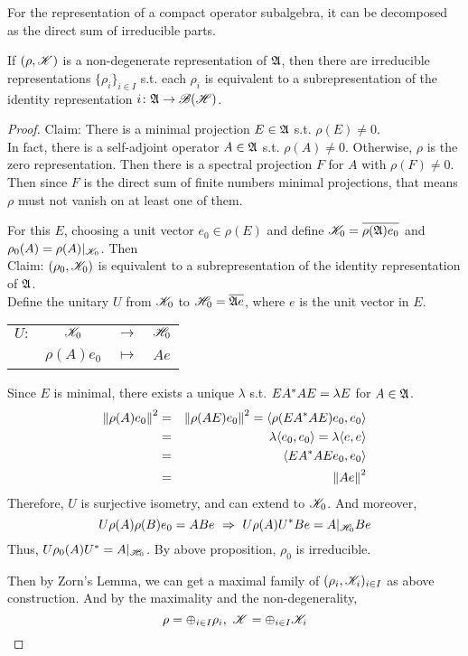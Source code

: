 \documentclass[a4paper,11pt]{report}
\begin{document}
For the representation of a compact operator subalgebra, it can be decomposed as the direct sum of irreducible parts.
\begin{thm}
	If $(\rho, \mathscr{K})$ is a non-degenerate representation of $\mathfrak{A}$, then there are irreducible representations $\{\rho_i\}_{i \in I}$ s.t. each $\rho_i$ is equivalent to a subrepresentation of the identity representation $i \colon \mathfrak{A} \rightarrow \mathscr{B(H)}$.
\end{thm}
\begin{proof}
	Claim: There is a minimal projection $E \in \mathfrak{A}$ s.t. $\rho(E) \neq 0$. \\
	In fact, there is a self-adjoint operator $A \in \mathfrak{A}$ s.t. $\rho(A) \neq 0$. Otherwise, $\rho$ is the zero representation. Then there is a spectral projection $F$ for $A$ with $\rho(F) \neq 0$. Then since $F$ is the direct sum of finite numbers minimal projections, that means $\rho$ must not vanish on at least one of them.
	\item For this $E$, choosing a unit vector $e_0 \in \rho(E)$ and define $\mathscr{K}_0 = \overline{\rho(\mathfrak{A})e_0}$ and $\rho_0(A) = \rho(A)|_{\mathscr{K}_0}$. Then \\
	Claim: $(\rho_0,\mathscr{K}_0)$ is equivalent to a subrepresentation of the identity representation of $\mathfrak{A}$.\\
	Define the unitary $U$ from $\mathscr{K}_0$ to $\mathscr{H}_0 = \overline{\mathfrak{A} e}$, where $e$ is the unit vector in $E$. 
	\begin{center}
		\begin{tabular}{l c c l}
			$U \colon$ & $\mathscr{K}_0$ & $\longrightarrow$ & $\mathscr{H}_0$ \\
			~ & $\rho(A)e_0$ & $\longmapsto$ & $Ae$
		\end{tabular}
	\end{center}
	Since $E$ is minimal, there exists a unique $\lambda$ s.t. $E A^{*}A E = \lambda E$ for $A \in \mathfrak{A}$.
	\begin{eqnarray*}
		\left\lVert\rho(A)e_0\right\lVert^2 &=& \left\lVert\rho(AE)e_0\right\lVert^2 = \langle \rho(E A^{*}AE)e_0,e_0 \rangle\\
		&=& \lambda \langle e_0,e_0 \rangle = \lambda \langle e,e \rangle \\
		&=& \langle E A^{*}AE e_0,e_0 \rangle \\
		&=& \left\lVert Ae\right\lVert^2
	\end{eqnarray*}
	Therefore, $U$ is surjective isometry, and can extend to $\mathscr{K}_0$. And moreover,
	\begin{equation*}
		U\rho(A)\rho(B)e_0 = A Be ~\Rightarrow~ U\rho(A) U^{*} Be = A|_{\mathscr{H}_0} Be
	\end{equation*}
	Thus, $U\rho_0(A)U^{*} = A|_{\mathscr{H}_0}$. By above proposition, $\rho_0$ is irreducible.
	\item Then by Zorn's Lemma, we can get a maximal family of $(\rho_i, \mathscr{K}_i)_{i \in I}$ as above construction. And by the maximality and the non-degenerality, 
	\begin{equation*}
		\rho = \oplus_{i \in I} \rho_i,~ \mathscr{K} = \oplus_{i \in I} \mathscr{K}_i \qedhere
	\end{equation*}
\end{proof}
\end{document}
